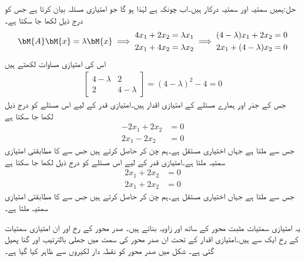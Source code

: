 حل:ہمیں سمتیہ  اور سمتیہ  درکار ہیں۔اب چونکہ  ہے لہٰذا  ہو گا جو امتیازی مسئلہ بیان کرتا ہے جس کو درج ذیل لکھا جا سکتا ہے۔
\begin{gather*}
\bM{A}\bM{x}=\lambda \bM{x} \implies \begin{aligned}4x_1+2x_2&=\lambda x_1\\2x_1+4x_2&=\lambda x_2 \end{aligned}\implies 
\begin{aligned}(4-\lambda)x_1+2x_2&=0\\2x_1+(4-\lambda)x_2&=0 \end{aligned}
\end{gather*}
اس کی امتیازی مساوات لکھتے ہیں
\begin{align*}
\begin{bmatrix} 4-\lambda& 2\\2&4-\lambda \end{bmatrix}=(4-\lambda)^2-4=0
\end{align*}
جس کے جذر  اور  ہمارے مسئلے کے امتیازی اقدار ہیں۔امتیازی قدر  کے لیے اس مسئلے کو درج ذیل لکھا جا سکتا ہے
\begin{align*}
-2x_1+2x_2&=0\\2x_1-2x_2&=0
\end{align*}
جس سے  ملتا ہے جہاں  اختیاری مستقل ہے۔ہم  چن کر  حاصل کرتے ہیں جس سے   کا مطابقتی امتیازی سمتیہ  ملتا ہے۔امتیازی قدر  کے لیے اس مسئلے کو درج ذیل لکھا جا سکتا ہے
\begin{align*}
2x_1+2x_2&=0\\2x_1+2x_2&=0
\end{align*}
جس سے  ملتا ہے جہاں  اختیاری مستقل ہے۔ہم  چن کر  حاصل کرتے ہیں جس سے   کا مطابقتی امتیازی سمتیہ  ملتا ہے۔

یہ امتیازی سمتیات مثبت  محور کے ساتھ  اور  زاویہ بناتے ہیں۔ صدر محور کے رخ اور ان امتیازی سمتیات کے رخ ایک سے  ہیں۔امتیازی اقدار کے تحت ان صدر محور کی سمت میں جھلی بالترتیب  اور  گنا پھیل گئی ہے۔ شکل  میں صدر محور کو نقطہ دار لکیروں سے ظاہر کیا گیا ہے۔

